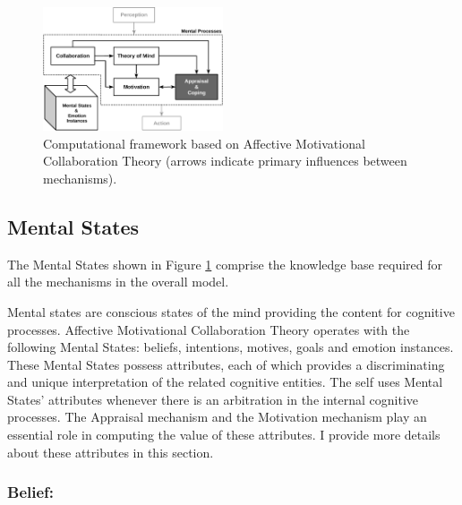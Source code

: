 \documentclass[letterpaper]{article}
\begin{document}
\begin{figure}[tbh]
  \centering
  \includegraphics[width=0.474\textwidth]{figure/theory-general-croped.pdf}
  \caption{Computational framework based on Affective Motivational Collaboration
  Theory (arrows indicate primary influences between mechanisms).}
  \label{fig:cpm}
\end{figure}

\subsection{Mental States}

The Mental States shown in Figure \ref{fig:cpm} comprise the knowledge
base required for all the mechanisms in the overall model.

Mental states are conscious states of the mind providing the content for
cognitive processes. Affective Motivational Collaboration Theory operates with
the following Mental States: beliefs, intentions, motives, goals and emotion
instances. These Mental States possess attributes, each of which provides a
discriminating and unique interpretation of the related cognitive entities. The
self uses Mental States' attributes whenever there is an arbitration in the
internal cognitive processes. The Appraisal mechanism and the Motivation
mechanism play an essential role in computing the value of these attributes. I
provide more details about these attributes in this section.

\subsubsection{Belief:}
\end{document}
